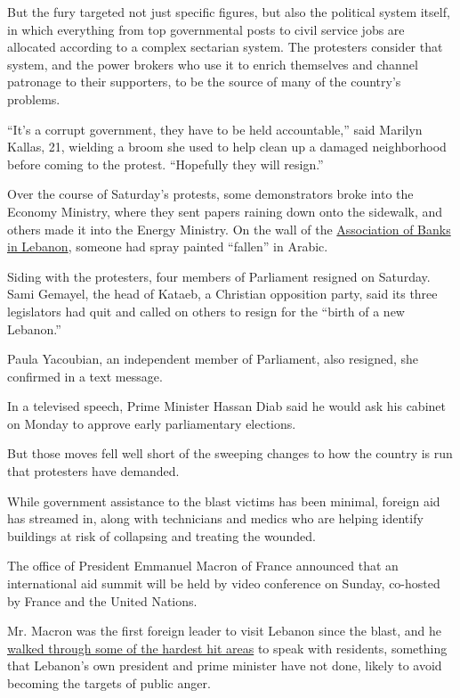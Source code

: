 But the fury targeted not just specific figures, but also the political
system itself, in which everything from top governmental posts to civil
service jobs are allocated according to a complex sectarian system. The
protesters consider that system, and the power brokers who use it to
enrich themselves and channel patronage to their supporters, to be the
source of many of the country's problems.

``It's a corrupt government, they have to be held accountable,'' said
Marilyn Kallas, 21, wielding a broom she used to help clean up a damaged
neighborhood before coming to the protest. ``Hopefully they will
resign.''

Over the course of Saturday's protests, some demonstrators broke into
the Economy Ministry, where they sent papers raining down onto the
sidewalk, and others made it into the Energy Ministry. On the wall of
the \href{https://www.abl.org.lb/english/home}{Association of Banks in
Lebanon}, someone had spray painted ``fallen'' in Arabic.

Siding with the protesters, four members of Parliament resigned on
Saturday. Sami Gemayel, the head of Kataeb, a Christian opposition
party, said its three legislators had quit and called on others to
resign for the ``birth of a new Lebanon.''

Paula Yacoubian, an independent member of Parliament, also resigned, she
confirmed in a text message.

In a televised speech, Prime Minister Hassan Diab said he would ask his
cabinet on Monday to approve early parliamentary elections.

But those moves fell well short of the sweeping changes to how the
country is run that protesters have demanded.

While government assistance to the blast victims has been minimal,
foreign aid has streamed in, along with technicians and medics who are
helping identify buildings at risk of collapsing and treating the
wounded.

The office of President Emmanuel Macron of France announced that an
international aid summit will be held by video conference on Sunday,
co-hosted by France and the United Nations.

Mr. Macron was the first foreign leader to visit Lebanon since the
blast, and he
\href{https://www.nytimes.com/2020/08/06/world/middleeast/beirut-explosion.html}{walked
through some of the hardest hit areas} to speak with residents,
something that Lebanon's own president and prime minister have not done,
likely to avoid becoming the targets of public anger.

